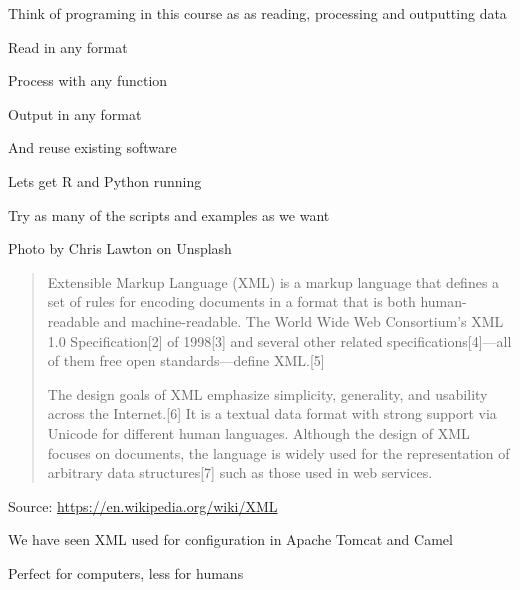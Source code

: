 \documentclass[Screen16to9,17pt]{foils}
\begin{document}
\begin{list2}
\item Think of programing in this course as as reading, processing and outputting data
\item Read in any format
\item Process with any function
\item Output in any format
\item And reuse existing software
\end{list2}






\begin{list2}
\item Lets get R and Python running
\item Try as many of the scripts and examples as we want
\end{list2}




Photo by Chris Lawton on Unsplash


\begin{quote}
  Extensible Markup Language (XML) is a markup language that defines a set of rules for encoding documents in a format that is both human-readable and machine-readable. The World Wide Web Consortium's XML 1.0 Specification[2] of 1998[3] and several other related specifications[4]—all of them free open standards—define XML.[5]

  The design goals of XML emphasize simplicity, generality, and usability across the Internet.[6] It is a textual data format with strong support via Unicode for different human languages. Although the design of XML focuses on documents, the language is widely used for the representation of arbitrary data structures[7] such as those used in web services.
\end{quote}
Source: \url{https://en.wikipedia.org/wiki/XML}

\begin{list2}
\item We have seen XML used for configuration in Apache Tomcat and Camel
\item Perfect for computers, less for humans
\end{list2}
\end{document}
